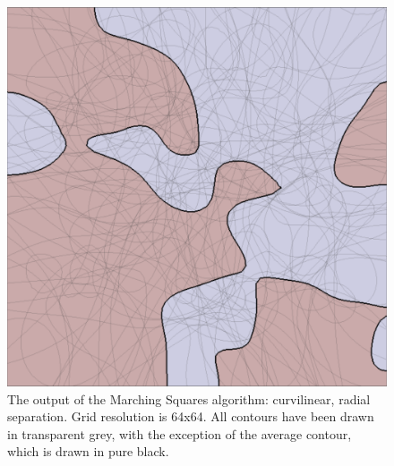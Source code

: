 \documentclass[12pt]{article}
\begin{document}
\begin{figure} 
\centering
  \includegraphics[width = 3 in]{10blur.png}
  \caption{The output of the Marching Squares algorithm: curvilinear, radial separation. 
Grid resolution is 64x64.
All contours have been drawn in transparent grey, with the exception of the average contour, which is drawn in pure black.
}
\end{figure}
\end{document}
